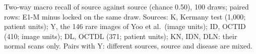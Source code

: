 Two-way macro recall of source against source (chance 0.50), 100 draws; paired rows: E1-M minus locked on the same draw. Sources: K, Kermany test (1,000; patient units); Y, the 146 rare images of Yoo et al.\ (image units); ID, OCTID (410; image units); DL, OCTDL (371; patient units); KN, IDN, DLN: their normal scans only. Pairs with Y: different sources, source and disease are mixed. 
